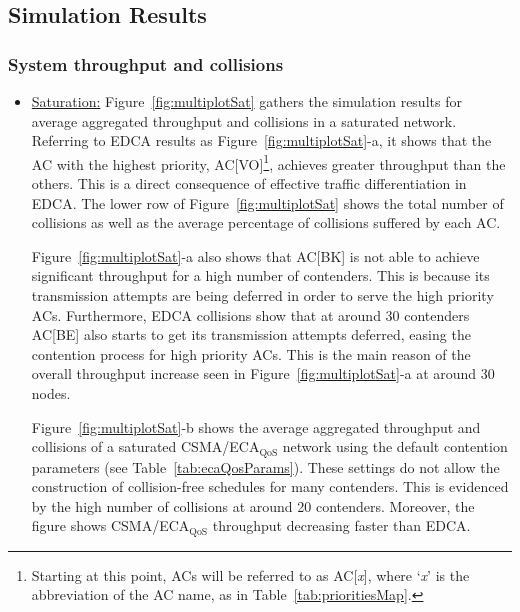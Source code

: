 \subsection{Simulation Results}\label{sim:results}
\subsubsection{System throughput and collisions}
\begin{itemize}
\item\underline{Saturation:} Figure~\ref{fig:multiplotSat} gathers the simulation results for average aggregated throughput and collisions in a saturated network. Referring to EDCA results as Figure~\ref{fig:multiplotSat}-a,  it shows that the AC with the highest priority, AC[VO]\footnote{Starting at this point, ACs will be referred to as AC[\emph{x}], where `\emph{x}' is the abbreviation of the AC name, as in Table~\ref{tab:prioritiesMap}.}, achieves greater throughput than the others. This is a direct consequence of effective traffic differentiation in EDCA. The lower row of Figure~\ref{fig:multiplotSat} shows the total number of collisions as well as the average percentage of collisions suffered by each AC. 

Figure~\ref{fig:multiplotSat}-a also shows that AC[BK] is not able to achieve significant throughput for a high number of contenders. This is because its transmission attempts are being deferred in order to serve the high priority ACs. Furthermore, EDCA collisions show that at around 30 contenders AC[BE] also starts to get its transmission attempts deferred, easing the contention process for high priority ACs. This is the main reason of the overall throughput increase seen in Figure~\ref{fig:multiplotSat}-a at around 30 nodes.

Figure~\ref{fig:multiplotSat}-b shows the average aggregated throughput and collisions of a saturated CSMA/ECA$_{\text{QoS}}$ network using the default contention parameters (see Table~\ref{tab:ecaQosParams}). These settings do not allow the construction of collision-free schedules for many contenders. This is evidenced by the high number of collisions at around 20 contenders. Moreover, the figure shows CSMA/ECA$_{\text{QoS}}$ throughput decreasing faster than EDCA.


\end{itemize}
